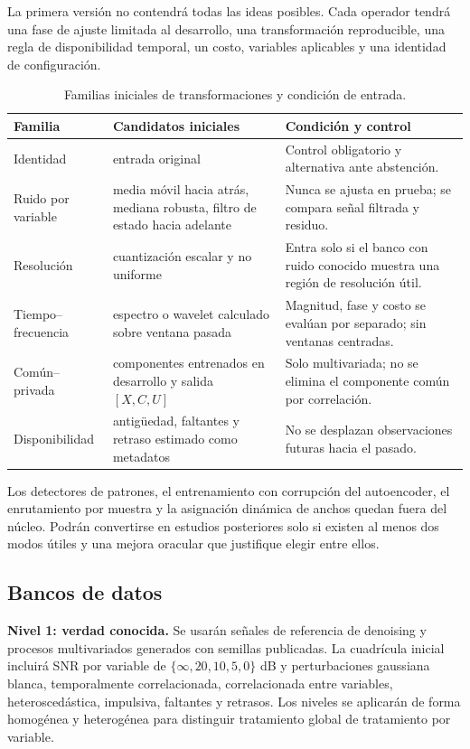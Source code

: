 \documentclass[11pt,letterpaper]{article}
\begin{document}
La primera versión no contendrá todas las ideas posibles.
Cada operador tendrá una fase de ajuste limitada al desarrollo, una transformación reproducible, una regla de disponibilidad temporal, un costo, variables aplicables y una identidad de configuración.

\begin{table}[H]
\centering
\caption{Familias iniciales de transformaciones y condición de entrada.}
\begin{tabularx}{\textwidth}{@{}L{3.0cm}L{4.0cm}Y@{}}
\toprule
\textbf{Familia} & \textbf{Candidatos iniciales} & \textbf{Condición y control} \\
\midrule
Identidad & entrada original & Control obligatorio y alternativa ante abstención. \\
Ruido por variable & media móvil hacia atrás, mediana robusta, filtro de estado hacia adelante & Nunca se ajusta en prueba; se compara señal filtrada y residuo. \\
Resolución & cuantización escalar y no uniforme & Entra solo si el banco con ruido conocido muestra una región de resolución útil. \\
Tiempo--frecuencia & espectro o wavelet calculado sobre ventana pasada & Magnitud, fase y costo se evalúan por separado; sin ventanas centradas. \\
Común--privada & componentes entrenados en desarrollo y salida $[X,C,U]$ & Solo multivariada; no se elimina el componente común por correlación. \\
Disponibilidad & antigüedad, faltantes y retraso estimado como metadatos & No se desplazan observaciones futuras hacia el pasado. \\
\bottomrule
\end{tabularx}
\end{table}

Los detectores de patrones, el entrenamiento con corrupción del autoencoder, el enrutamiento por muestra y la asignación dinámica de anchos quedan fuera del núcleo.
Podrán convertirse en estudios posteriores solo si existen al menos dos modos útiles y una mejora oracular que justifique elegir entre ellos.

\subsection{Bancos de datos}

\textbf{Nivel 1: verdad conocida.}
Se usarán señales de referencia de denoising y procesos multivariados generados con semillas publicadas.
La cuadrícula inicial incluirá SNR por variable de $\{\infty,20,10,5,0\}$ dB y perturbaciones gaussiana blanca, temporalmente correlacionada, correlacionada entre variables, heteroscedástica, impulsiva, faltantes y retrasos.
Los niveles se aplicarán de forma homogénea y heterogénea para distinguir tratamiento global de tratamiento por variable.
\end{document}
